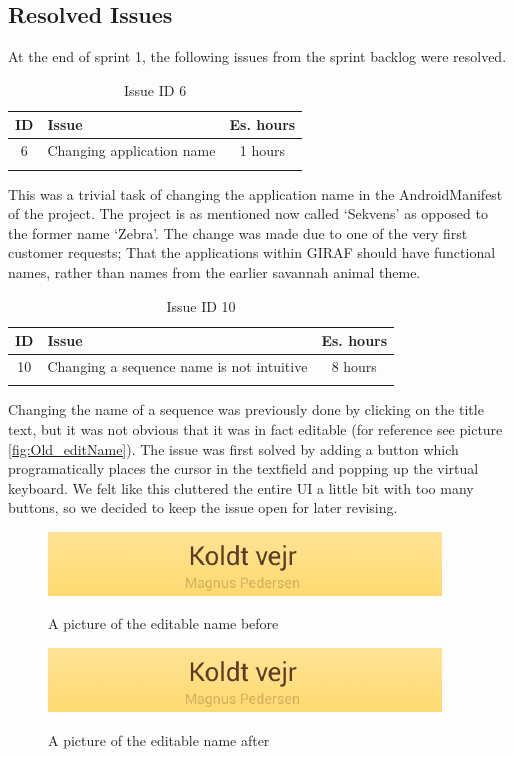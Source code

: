 \subsection{Resolved Issues} \label{subsec:spr1_resolved_issues}

At the end of sprint 1, the following issues from the sprint backlog were resolved.
\begin{longtable} { | c | p{12cm} | c | } 
\hline
	ID 	&	Issue	&		 Es. hours \\\hline
	6	& 	Changing application name	&	1 hours	\\\hline
\caption{Issue ID 6}
\label{tab:spr1_issue6}
\end{longtable}
This was a trivial task of changing the application name in the AndroidManifest of the project. The project is as mentioned now called `Sekvens' as opposed to the former name `Zebra'. The change was made due to one of the very first customer requests; That the applications within GIRAF should have functional names, rather than names from the earlier savannah animal theme.

\begin{longtable} { | c | p{12cm} | c | } 
\hline
	ID 	&	Issue	&		 Es. hours \\\hline
	10	& 	Changing a sequence name is not intuitive	&	8 hours	\\\hline
\caption{Issue ID 10}
\label{tab:spr1_issue10}
\end{longtable}
Changing the name of a sequence was previously done by clicking on the title text, but it was not obvious that it was in fact editable (for reference see picture \ref{fig:Old_editName}).  The issue was first solved by adding a button which programatically places the cursor in the textfield and popping up the virtual keyboard. We felt like this cluttered the entire UI a little bit with too many buttons, so we decided to keep the issue open for later revising. 
\begin{figure} [h!]
\centering
\begin{minipage}{.7\textwidth}
\centering
\includegraphics{Pics/Sprint1/Gammelt/change_sequence_name}
\caption{A picture of the editable name before}
\label{fig:Old_editName}
\includegraphics{Pics/Sprint1/Gammelt/change_sequence_name}
\caption{A picture of the editable name after}
\label{fig:New_editName}
\end{minipage}\hfill
\end{figure}

